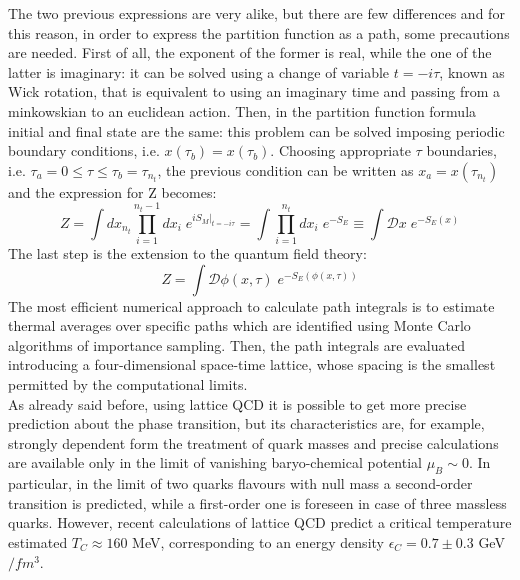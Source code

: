 The two previous expressions are very alike, but there are few differences and for this reason, in order to express the partition function as a path, some precautions are needed. First of all, the exponent of the former is real, while the one of the latter is imaginary: it can be solved using a change of variable $t = -i \tau$, known as Wick rotation, that is equivalent to using an imaginary time and passing from a minkowskian to an euclidean action. Then, in the partition function formula initial and final state are the same: this problem can be solved imposing periodic boundary conditions, i.e. $x(\tau_{b}) = x(\tau_{b})$. Choosing appropriate $\tau$ boundaries, i.e. $\tau_{a} = 0 \leq \tau \leq \tau_{b} = \tau_{n_{t}}$, the previous condition can be written as $x_{a} = x(\tau_{n_{t}})$ and the expression for Z becomes:
%
\begin{equation}
 Z = \int dx_{n_{t}} \prod\limits_{i=1}^{n_{t}-1}dx_{i} \; e^{iS_{M}\Big|_{t=-i\tau}} = \int \prod\limits_{i=1}^{n_{t}}dx_{i} \; e^{-S_{E}} \equiv \int \mathcal{D}x \; e^{-S_{E}(x)}
\end{equation}
%
The last step is the extension to the quantum field theory:
%
\begin{equation}
 Z = \int \mathcal{D}\phi(x,\tau) \; e^{-S_{E}(\phi(x,\tau))}
\end{equation}
%
The most efficient numerical approach to calculate path integrals is to estimate thermal averages over specific paths which are identified using Monte Carlo algorithms of importance sampling. Then, the path integrals are evaluated introducing a four-dimensional space-time lattice, whose spacing is the smallest permitted by the computational limits.\\
As already said before, using lattice QCD it is possible to get more precise prediction about the phase transition, but its characteristics are, for example, strongly dependent form the treatment of quark masses and precise calculations are available only in the limit of vanishing baryo-chemical potential $\mu_{B}\sim0$. In particular, in the limit of two quarks flavours with null mass a second-order transition is predicted, while a first-order one is foreseen in case of three massless quarks. However, recent calculations of lattice QCD predict a critical temperature estimated $T_{C}\approx160$ MeV, corresponding to an energy density $\epsilon_{C} = 0.7 \pm 0.3$ GeV$/fm^{3}$\cite{lattice}.

